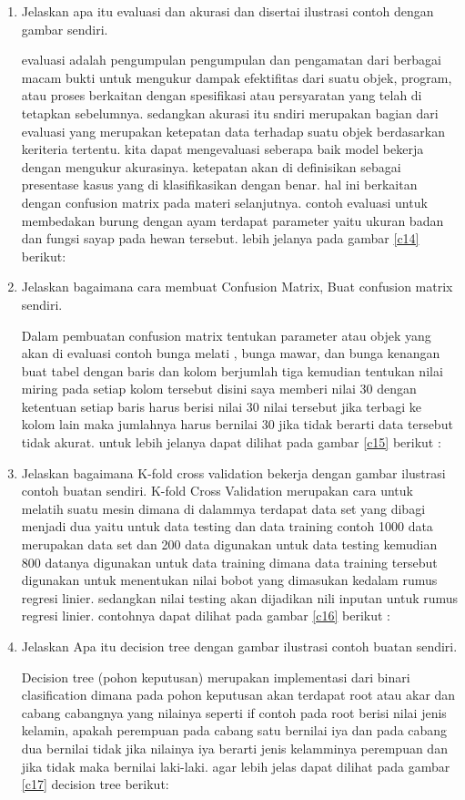 \begin{enumerate}
\item Jelaskan apa itu evaluasi dan akurasi dan disertai ilustrasi contoh dengan gambar sendiri.\par
evaluasi adalah pengumpulan pengumpulan dan pengamatan dari berbagai macam bukti untuk mengukur dampak efektifitas dari suatu objek, program, atau proses berkaitan  dengan spesifikasi atau persyaratan yang telah di tetapkan sebelumnya. sedangkan akurasi itu sndiri merupakan bagian dari evaluasi yang merupakan ketepatan data terhadap suatu objek berdasarkan keriteria tertentu. kita dapat mengevaluasi seberapa baik model bekerja dengan mengukur akurasinya. ketepatan akan di definisikan sebagai presentase kasus yang di klasifikasikan dengan benar. hal ini berkaitan dengan confusion matrix pada materi selanjutnya. contoh evaluasi untuk membedakan burung dengan ayam terdapat parameter yaitu ukuran badan dan fungsi sayap pada hewan tersebut. lebih jelanya pada gambar \ref{c14} berikut:

\item Jelaskan bagaimana cara membuat Confusion Matrix, Buat confusion matrix sendiri.\par
Dalam pembuatan confusion matrix tentukan parameter atau objek yang akan di evaluasi contoh bunga melati , bunga mawar, dan bunga kenangan buat tabel dengan baris dan kolom berjumlah tiga kemudian tentukan nilai miring pada setiap kolom tersebut disini saya memberi nilai 30 dengan ketentuan setiap baris harus berisi nilai 30 nilai tersebut jika terbagi ke kolom lain maka jumlahnya harus bernilai 30 jika tidak berarti data tersebut tidak akurat. untuk lebih jelanya dapat dilihat pada gambar \ref{c15} berikut :

\item Jelaskan bagaimana K-fold cross validation bekerja dengan gambar ilustrasi contoh buatan sendiri.
K-fold Cross Validation merupakan cara untuk melatih suatu mesin dimana di dalammya terdapat data set yang dibagi menjadi dua yaitu untuk data testing dan data training contoh 1000 data merupakan data set dan 200 data digunakan untuk data testing kemudian 800 datanya digunakan untuk data training dimana data training tersebut digunakan untuk menentukan nilai bobot yang dimasukan kedalam rumus regresi linier. sedangkan nilai testing akan dijadikan nili inputan untuk rumus regresi linier. contohnya dapat dilihat pada gambar \ref{c16}  berikut :

\item Jelaskan Apa itu decision tree dengan gambar ilustrasi contoh buatan sendiri.\par
Decision tree (pohon keputusan) merupakan implementasi dari binari clasification dimana pada pohon keputusan akan terdapat root atau akar dan cabang cabangnya yang nilainya seperti if contoh pada root berisi nilai jenis kelamin, apakah perempuan pada cabang satu bernilai iya dan pada cabang dua bernilai tidak jika nilainya iya berarti jenis kelamminya perempuan dan jika tidak maka bernilai laki-laki.
agar lebih jelas dapat dilihat pada gambar \ref{c17}  decision tree berikut:


\end{enumerate}
